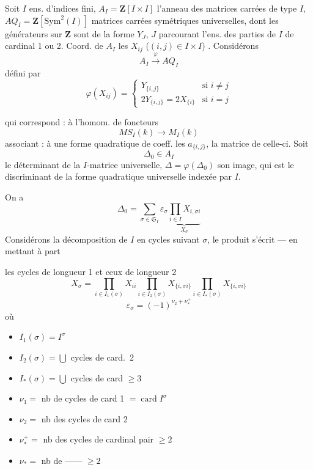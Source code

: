 \documentclass[11pt,a4paper]{article}
\begin{document}
Soit $I$ ens. d'indices fini, $A_I = \mathbf{Z}[I \times I]$ l'anneau \struck{\ill{}} des matrices  carrées de type $I$, $AQ_I = \mathbf{Z}[\mathrm{Sym}^2(I)]$  \struck{\ill{}} matrices carrées symétriques universelles, \struck{\ill{}} dont les générateurs sur $\mathbf{Z}$ sont  de la forme $Y_J$, $J$ parcourant l'ens. des parties de $I$ de cardinal 1 ou 2. Coord. de $A_I$  les $X_{ij}$ ($(i,j) \in I \times I$) \struck{\ill{}}. Considérons
\[
  A_I \xrightarrow{\ \varphi\ } AQ_I
\]
défini par
\[
  \varphi(X_{ij}) =
  \begin{cases}
    Y_{\{i,j\}} & \text{si } i \neq j \\
    2Y_{\{i,j\}} = 2X_{\{i\}} & \text{si } i = j
  \end{cases}
\]

qui correspond : à l'homom. de foncteurs
\[
  MS_I(k) \longrightarrow M_I(k)
\]
associant : à une forme quadratique de coeff. les $a_{\{i,j\}}$, la matrice de celle-ci. Soit
\[
  \Delta_0 \in A_I
\]
le déterminant de la $I$-matrice universelle, $\Delta = \varphi(\Delta_0)$ son image, qui est le discriminant de la forme quadratique universelle indexée par $I$.

On a
\[
  \Delta_0 = \sum_{\sigma \in \mathfrak{S}_I} \varepsilon_\sigma
  \underbrace{\prod_{i \in I} X_{i, \sigma i}}_{X_\sigma}
\]
Considérons la décomposition de $I$ en cycles suivant $\sigma$, le produit s'écrit --- en mettant à part

les cycles de longueur 1 et ceux de longueur 2
\[
  X_\sigma = \prod_{i \in I_1(\sigma)} X_{ii}
  \prod_{i \in I_2(\sigma)} X_{\{i, \sigma i\}}
  \prod_{i \in I_*(\sigma)} X_{\{i, \sigma i\}}
\]
\[
  \varepsilon_\sigma = (-1)^{\nu_2 + \nu_*^+}
\]
où
\begin{itemize}
  \item $I_1(\sigma) = I^\sigma$
  \item $I_2(\sigma) = \bigcup$ cycles de card.~2
  \item $I_*(\sigma) = \bigcup$ cycles de card $\geq 3$
  \item $\nu_1 =$ nb de cycles de card 1 $= \operatorname{card} I^\sigma$ 
  \item $\nu_2 =$ nb des cycles de card 2
  \item $\nu_*^+ =$ nb des cycles de cardinal pair $\geq 2$
  \item $\nu_* =$ nb de ------ $\geq 2$%
\end{itemize}
\end{document}
